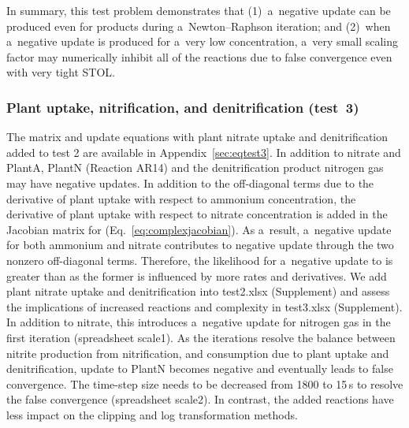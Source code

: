 \documentclass[gmd,noline]{copernicus}
\begin{document}
      In summary, this test problem demonstrates that (1)~a~negative update
      can be produced even for products during a~Newton--Raphson iteration;
      and (2)~when a~negative update is produced for a~very low
      concentration, a~very small scaling factor may numerically inhibit all
      of the reactions due to false convergence even with very tight STOL.




\subsubsection*{Plant uptake, nitrification, and denitrification (test~3)}

      The matrix and update equations with plant nitrate uptake and
      denitrification added to test 2 are available in
      Appendix~\ref{sec:eqtest3}. In addition to nitrate and PlantA, PlantN  (Reaction AR14)
      and the denitrification product nitrogen gas may have negative
      updates. In addition to the off-diagonal terms due to the derivative
      of plant uptake with respect to ammonium concentration, the derivative
      of plant uptake with respect to nitrate concentration is added in the
      Jacobian matrix for  (Eq.~\ref{eq:complexjacobian}). As
      a~result, a~negative update for both ammonium and nitrate contributes
      to negative  update through the two nonzero off-diagonal
      terms.  Therefore, the likelihood for a~negative update to
       is greater than  as the former is
      influenced by more rates and derivatives. We add plant nitrate uptake
      and denitrification into test2.xlsx (Supplement) and assess the implications of
      increased reactions and complexity in test3.xlsx (Supplement). In addition to
      nitrate, this introduces a~negative update for nitrogen gas in the
      first iteration (spreadsheet scale1).  As the iterations resolve the
      balance between nitrite production from nitrification, and consumption
      due to plant uptake and denitrification, update to PlantN becomes
      negative and eventually leads to false convergence. The time-step size
      needs to be decreased from 1800 to 15\,\unit{s} to resolve the false
      convergence (spreadsheet scale2). In contrast, the added reactions
      have less impact on the clipping and log transformation methods.
\end{document}
